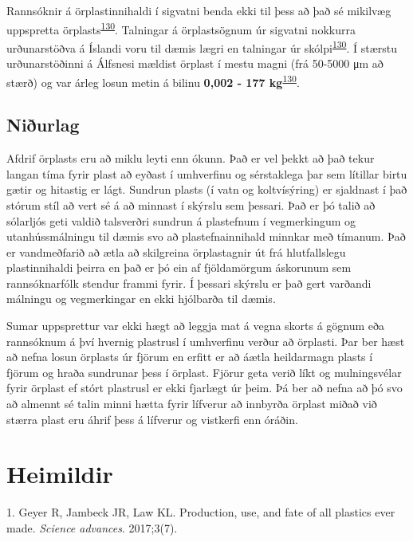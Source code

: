 \documentclass[icelandic,]{book}
\begin{document}
Rannsóknir á örplastinnihaldi í sigvatni benda ekki til þess að það sé mikilvæg uppspretta örplasts\textsuperscript{\protect\hyperlink{ref-Praagh1277395}{130}}. Talningar á örplastsögnum úr sigvatni nokkurra urðunarstöðva á Íslandi voru til dæmis lægri en talningar úr skólpi\textsuperscript{\protect\hyperlink{ref-Praagh1277395}{130}}. Í stærstu urðunarstöðinni á Álfsnesi mældist örplast í mestu magni (frá 50-5000 μm að stærð) og var árleg losun metin á bilinu \textbf{0,002 - 177 kg}\textsuperscript{\protect\hyperlink{ref-Praagh1277395}{130}}.

\hypertarget{niurlag}{%
\section*{Niðurlag}\label{niurlag}}

Afdrif örplasts eru að miklu leyti enn ókunn. Það er vel þekkt að það tekur langan tíma fyrir plast að eyðast í umhverfinu og sérstaklega þar sem lítillar birtu gætir og hitastig er lágt. Sundrun plasts (í vatn og koltvísýring) er sjaldnast í það stórum stíl að vert sé á að minnast í skýrslu sem þessari. Það er þó talið að sólarljós geti valdið talsverðri sundrun á plastefnum í vegmerkingum og utanhússmálningu til dæmis svo að plastefnainnihald minnkar með tímanum. Það er vandmeðfarið að ætla að skilgreina örplastagnir út frá hlutfallslegu plastinnihaldi þeirra en það er þó ein af fjöldamörgum áskorunum sem rannsóknarfólk stendur frammi fyrir. Í þessari skýrslu er það gert varðandi málningu og vegmerkingar en ekki hjólbarða til dæmis.

Sumar uppsprettur var ekki hægt að leggja mat á vegna skorts á gögnum eða rannsóknum á því hvernig plastrusl í umhverfinu verður að örplasti. Þar ber hæst að nefna losun örplasts úr fjörum en erfitt er að áætla heildarmagn plasts í fjörum og hraða sundrunar þess í örplast. Fjörur geta verið líkt og mulningsvélar fyrir örplast ef stórt plastrusl er ekki fjarlægt úr þeim. Þá ber að nefna að þó svo að almennt sé talin minni hætta fyrir lífverur að innbyrða örplast miðað við stærra plast eru áhrif þess á lífverur og vistkerfi enn óráðin.

\hypertarget{heimildir}{%
\chapter*{Heimildir}\label{heimildir}}

\hypertarget{refs}{}
\leavevmode\hypertarget{ref-geyer2017production}{}%
1. Geyer R, Jambeck JR, Law KL. Production, use, and fate of all plastics ever made. \emph{Science advances}. 2017;3(7).
\end{document}
